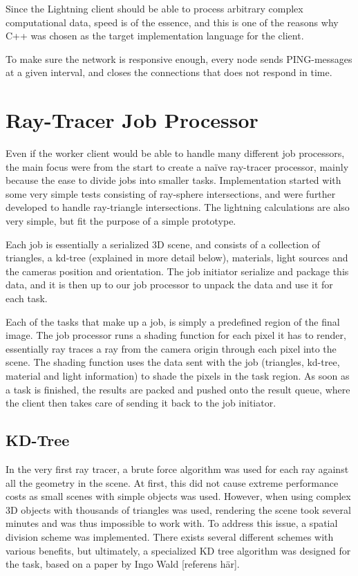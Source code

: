 Since the Lightning client should be able to process arbitrary complex computational data, speed is of the essence, and this is one of the reasons why C++ was chosen as the target implementation language for the client.

To make sure the network is responsive enough, every node sends PING-messages at a given interval, and closes the connections that does not respond in time.

\section{Ray-Tracer Job Processor}
Even if the worker client would be able to handle many different job processors, the main focus were from the start to create a naïve ray-tracer processor, mainly because the ease to divide jobs into smaller tasks. Implementation started with some very simple tests consisting of ray-sphere intersections, and were further developed to handle ray-triangle intersections. The lightning calculations are also very simple, but fit the purpose of a simple prototype.

Each job is essentially a serialized 3D scene, and consists of a collection of triangles, a kd-tree (explained in more detail below), materials, light sources and the cameras position and orientation. The job initiator serialize and package this data, and it is then up to our job processor to unpack the data and use it for each task.

Each of the tasks that make up a job, is simply a predefined region of the final image. The job processor runs a shading function for each pixel it has to render, essentially ray traces a ray from the camera origin through each pixel into the scene. The shading function uses the data sent with the job (triangles, kd-tree, material and light information) to shade the pixels in the task region. As soon as a task is finished, the results are packed and pushed onto the result queue, where the client then takes care of sending it back to the job initiator.

\subsection{KD-Tree}
In the very first ray tracer, a brute force algorithm was used for each ray against all the geometry in the scene. At first, this did not cause extreme performance costs as small scenes with simple objects was used. However, when using complex 3D objects with thousands of triangles was used, rendering the scene took several minutes and was thus impossible to work with. To address this issue, a spatial division scheme was implemented. There exists several different schemes with various benefits, but ultimately, a specialized KD tree algorithm was designed for the task, based on a paper by Ingo Wald [referens här]. 


